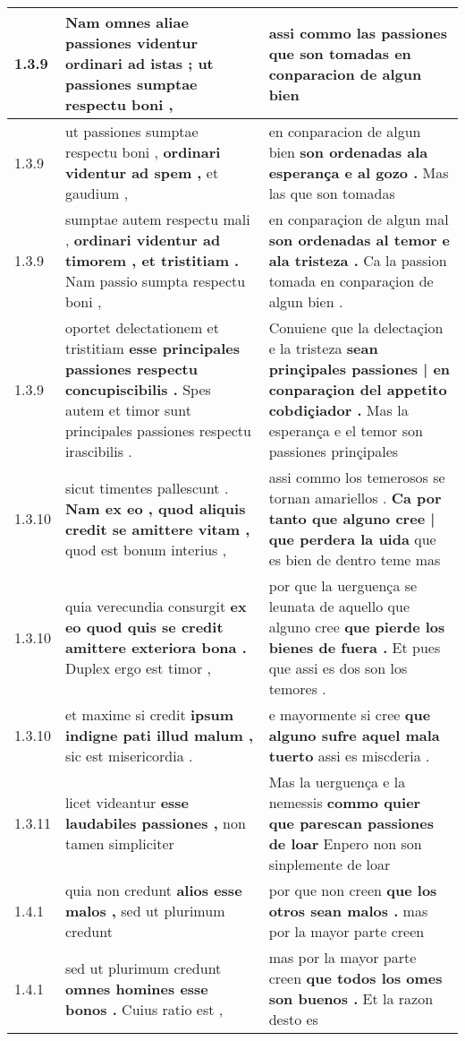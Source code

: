 \begin{tabular}{|p{1cm}|p{6.5cm}|p{6.5cm}|}
1.3.9 & Nam omnes aliae passiones videntur \textbf{ ordinari ad istas ; } ut passiones sumptae respectu boni , & assi commo las passiones \textbf{ que son tomadas } en conparacion de algun bien \\\hline
1.3.9 & ut passiones sumptae respectu boni , \textbf{ ordinari videntur ad spem , } et gaudium , & en conparacion de algun bien \textbf{ son ordenadas ala esperança e al gozo . } Mas las que son tomadas \\\hline
1.3.9 & sumptae autem respectu mali , \textbf{ ordinari videntur ad timorem , et tristitiam . } Nam passio sumpta respectu boni , & en conparaçion de algun mal \textbf{ son ordenadas al temor e ala tristeza . } Ca la passion tomada en conparaçion de algun bien . \\\hline
1.3.9 & oportet delectationem et tristitiam \textbf{ esse principales passiones respectu concupiscibilis . } Spes autem et timor sunt principales passiones respectu irascibilis . & Conuiene que la delectaçion e la tristeza \textbf{ sean prinçipales passiones | en conparaçion del appetito cobdiçiador . } Mas la esperança e el temor son passiones prinçipales \\\hline
1.3.10 & sicut timentes pallescunt . \textbf{ Nam ex eo , quod aliquis credit se amittere vitam , } quod est bonum interius , & assi commo los temerosos se tornan amariellos . \textbf{ Ca por tanto que alguno cree | que perdera la uida } que es bien de dentro teme mas \\\hline
1.3.10 & quia verecundia consurgit \textbf{ ex eo quod quis se credit amittere exteriora bona . } Duplex ergo est timor , & por que la uerguença se leunata de aquello que alguno cree \textbf{ que pierde los bienes de fuera . } Et pues que assi es dos son los temores . \\\hline
1.3.10 & et maxime si credit \textbf{ ipsum indigne pati illud malum , } sic est misericordia . & e mayormente si cree \textbf{ que alguno sufre aquel mala tuerto } assi es miscderia . \\\hline
1.3.11 & licet videantur \textbf{ esse laudabiles passiones , } non tamen simpliciter & Mas la uerguença e la nemessis \textbf{ commo quier que parescan passiones de loar } Enpero non son sinplemente de loar \\\hline
1.4.1 & quia non credunt \textbf{ alios esse malos , } sed ut plurimum credunt & por que non creen \textbf{ que los otros sean malos . } mas por la mayor parte creen \\\hline
1.4.1 & sed ut plurimum credunt \textbf{ omnes homines esse bonos . } Cuius ratio est , & mas por la mayor parte creen \textbf{ que todos los omes son buenos . } Et la razon desto es \\\hline

\end{tabular}
